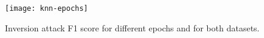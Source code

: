 \begin{figure}[h]
	\centering
	\texttt{[image: knn-epochs]} %
	\caption[Inversion attack F1 score for different epochs]{
		Inversion attack F1 score for different epochs and for both datasets.
	}\label{figure:knn-epochs}
\end{figure}
